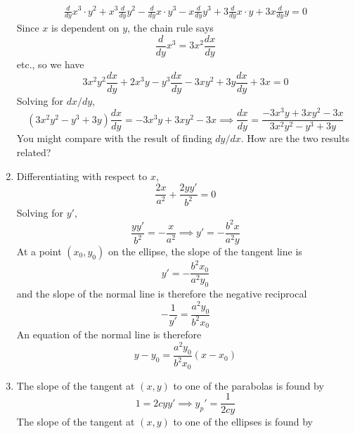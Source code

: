 \documentclass{article}
\begin{document}
\begin{enumerate}
\begin{align*}
    \frac{d}{dy} x^3 \cdot y^2 + x^3 \frac{d}{dy} y^2
    - \frac{d}{dy} x \cdot y^3 - x\frac{d}{dy} y^3 
    + 3\frac{d}{dy} x \cdot y + 3x \frac{d}{dy} y = 0
  \end{align*}
  Since $x$ is dependent on $y$, the chain rule says
  \begin{equation*}
    \frac{d}{dy} x^3 = 3x^2 \frac{dx}{dy}
  \end{equation*}
  etc., so we have
  \begin{equation*}
    3x^2y^2 \frac{dx}{dy} + 2x^3 y - y^3 \frac{dx}{dy} - 3xy^2 +
    3y\frac{dx}{dy} + 3x = 0
  \end{equation*}
  Solving for $dx/dy$,
  \begin{equation*}
    (3x^2y^2-y^3+3y) \frac{dx}{dy} = -3x^3y+3xy^2-3x 
    \implies \frac{dx}{dy} = \frac{-3x^3y+3xy^2-3x}{3x^2y^2-y^3+3y}
  \end{equation*}
  You might compare with the result of finding $dy/dx$.  How are the
  two results related?
\item %
  Differentiating with respect to $x$,
  \begin{equation*}
    \frac{2x}{a^2} + \frac{2yy'}{b^2} = 0
  \end{equation*}
  Solving for $y'$,
  \begin{equation*}
    \frac{yy'}{b^2} = -\frac{x}{a^2} \implies y' = -\frac{b^2x}{a^2y}
  \end{equation*}
  At a point $(x_0,y_0)$ on the ellipse, the slope of the tangent line
  is
  \begin{equation*}
    y' = -\frac{b^2x_0}{a^2y_0}
  \end{equation*}
  and the slope of the normal line is therefore the negative reciprocal
  \begin{equation*}
    -\frac{1}{y'} = \frac{a^2y_0}{b^2x_0}
  \end{equation*}
  An equation of the normal line is therefore
  \begin{equation*}
    y-y_0 = \frac{a^2y_0}{b^2x_0} (x-x_0)
  \end{equation*}
\item %
  The slope of the tangent at $(x,y)$ to one of the parabolas is found by
  \begin{equation*}
    1 = 2cyy' \implies y_p' = \frac{1}{2cy}
  \end{equation*}
  The slope of the tangent at $(x,y)$ to one of the ellipses is found
  by
  \begin{equation*}

\end{equation*}
\end{enumerate}
\end{document}
